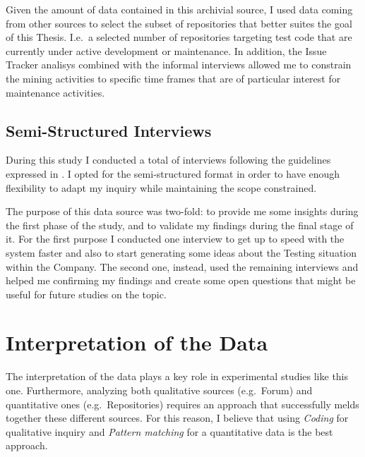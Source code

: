 Given the amount of data contained in this archivial source, I used data coming from other sources to select the subset of repositories that better suites the goal of this Thesis. I.e.\ a selected number of repositories targeting test code that are currently under active development or maintenance. In addition, the Issue Tracker analisys combined with the informal interviews allowed me to constrain the mining activities to specific time frames that are of particular interest for maintenance activities. 


\subsection{Semi-Structured Interviews} \label{semi-structured_interviews}
During this study I conducted a total of  interviews following the guidelines expressed in \cite{interview_guideline}. I opted for the semi-structured format in order to have enough flexibility to adapt my inquiry while maintaining the scope constrained.

The purpose of this data source was two-fold: to provide me some insights during the first phase of the study, and to validate my findings during the final stage of it. For the first purpose I conducted one interview to get up to speed with the system faster and also to start generating some ideas about the Testing situation within the Company. The second one, instead, used the remaining interviews and helped me confirming my findings and create some open questions that might be useful for future studies on the topic.




%
%
%
%


%
%
%
%
\section{Interpretation of the Data} \label{data_interpretation}

The interpretation of the data plays a key role in experimental studies like this one. Furthermore, analyzing both qualitative sources (e.g.\ Forum) and quantitative ones (e.g.\ Repositories) requires an approach that successfully melds together these different sources. For this reason, I believe that using \textit{Coding} \cite{qualitative_inquiry} for qualitative inquiry and \textit{Pattern matching} \cite{case_study_guide} for a quantitative data is the best approach.

